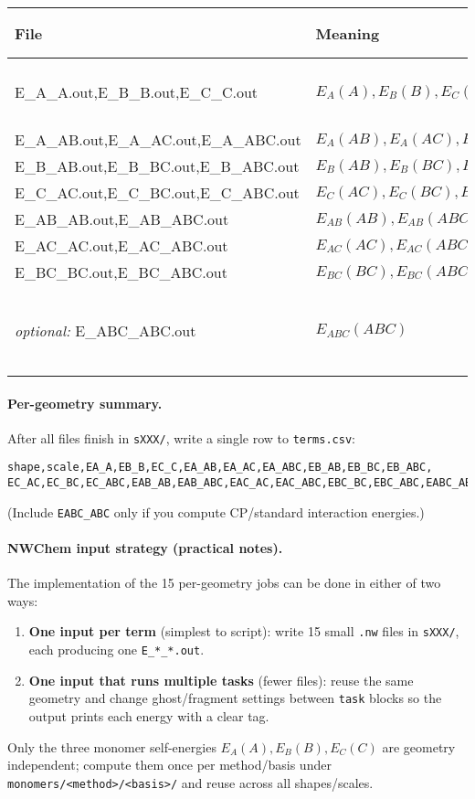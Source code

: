 \begin{center}
\begin{tabular}{lll}
\hline
\textbf{File} & \textbf{Meaning} & \textbf{Per-geom?} \\
\hline
E\_A\_A.out,\;E\_B\_B.out,\;E\_C\_C.out & \(E_A(A),E_B(B),E_C(C)\) & no (compute once) \\
E\_A\_AB.out,\;E\_A\_AC.out,\;E\_A\_ABC.out & \(E_A(AB),E_A(AC),E_A(ABC)\) & yes \\
E\_B\_AB.out,\;E\_B\_BC.out,\;E\_B\_ABC.out & \(E_B(AB),E_B(BC),E_B(ABC)\) & yes \\
E\_C\_AC.out,\;E\_C\_BC.out,\;E\_C\_ABC.out & \(E_C(AC),E_C(BC),E_C(ABC)\) & yes \\
E\_AB\_AB.out,\;E\_AB\_ABC.out & \(E_{AB}(AB),E_{AB}(ABC)\) & yes \\
E\_AC\_AC.out,\;E\_AC\_ABC.out & \(E_{AC}(AC),E_{AC}(ABC)\) & yes \\
E\_BC\_BC.out,\;E\_BC\_ABC.out & \(E_{BC}(BC),E_{BC}(ABC)\) & yes \\
\hline
\textit{optional: } E\_ABC\_ABC.out & \(E_{ABC}(ABC)\) & yes (needed for CP or std.) \\
\hline
\end{tabular}
\end{center}

\paragraph{Per-geometry summary.}
After all files finish in \texttt{sXXX/}, write a single row to
\texttt{terms.csv}:
\begin{verbatim}
shape,scale,EA_A,EB_B,EC_C,EA_AB,EA_AC,EA_ABC,EB_AB,EB_BC,EB_ABC,
EC_AC,EC_BC,EC_ABC,EAB_AB,EAB_ABC,EAC_AC,EAC_ABC,EBC_BC,EBC_ABC,EABC_ABC
\end{verbatim}
(Include \texttt{EABC\_ABC} only if you compute CP/standard interaction energies.)
\clearpage

\paragraph{NWChem input strategy (practical notes).}
The implementation of the 15 per-geometry jobs can be done in either of two ways:
\begin{enumerate}[label=(\alph*),leftmargin=2em]
\item \textbf{One input per term} (simplest to script): write 15 small
      \texttt{.nw} files in \texttt{sXXX/}, each producing one
      \texttt{E\_*\_*.out}.
\item \textbf{One input that runs multiple tasks} (fewer files): reuse the
      same geometry and change ghost/fragment settings between
      \texttt{task} blocks so the output prints each energy with a clear tag.
\end{enumerate}
Only the three monomer self-energies \(E_A(A),E_B(B),E_C(C)\) are
geometry independent; compute them once per method/basis under
\texttt{monomers/<method>/<basis>/} and reuse across all shapes/scales.

